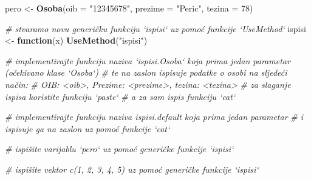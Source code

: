 \documentclass[]{book}
\newenvironment{Shaded}{\begin{snugshade}}{\end{snugshade}}
\newcommand{\KeywordTok}[1]{\textcolor[rgb]{0.13,0.29,0.53}{\textbf{#1}}}
\newcommand{\DataTypeTok}[1]{\textcolor[rgb]{0.13,0.29,0.53}{#1}}
\newcommand{\DecValTok}[1]{\textcolor[rgb]{0.00,0.00,0.81}{#1}}
\newcommand{\CharTok}[1]{\textcolor[rgb]{0.31,0.60,0.02}{#1}}
\newcommand{\StringTok}[1]{\textcolor[rgb]{0.31,0.60,0.02}{#1}}
\newcommand{\CommentTok}[1]{\textcolor[rgb]{0.56,0.35,0.01}{\textit{#1}}}
\newcommand{\ControlFlowTok}[1]{\textcolor[rgb]{0.13,0.29,0.53}{\textbf{#1}}}
\newcommand{\OperatorTok}[1]{\textcolor[rgb]{0.81,0.36,0.00}{\textbf{#1}}}
\newcommand{\NormalTok}[1]{#1}
\theoremstyle{definition}
\theoremstyle{definition}
\theoremstyle{definition}
\theoremstyle{remark}
\begin{document}
\begin{Shaded}
\begin{Highlighting}[]
\NormalTok{pero <-}\StringTok{ }\KeywordTok{Osoba}\NormalTok{(}\DataTypeTok{oib =} \StringTok{"12345678"}\NormalTok{, }\DataTypeTok{prezime =} \StringTok{"Peric"}\NormalTok{, }\DataTypeTok{tezina =} \DecValTok{78}\NormalTok{)}

\CommentTok{# stvaramo novu generičku funkciju `ispisi` uz pomoć funkcije `UseMethod`}
\NormalTok{ispisi <-}\StringTok{ }\ControlFlowTok{function}\NormalTok{(x) }\KeywordTok{UseMethod}\NormalTok{(}\StringTok{"ispisi"}\NormalTok{)}

\CommentTok{# implementirajte funkciju naziva `ispisi.Osoba` koja prima jedan parametar (očekivano klase `Osoba`)}
\CommentTok{# te na zaslon ispisuje podatke o osobi na sljedeći način:}
\CommentTok{# OIB: <oib>, Prezime: <prezime>, tezina: <tezina>}
\CommentTok{# za slaganje ispisa koristite funkciju `paste`}
\CommentTok{# a za sam ispis funkciju `cat`}

\CommentTok{# implementirajte funkciju naziva ispisi.default koja prima jedan parametar}
\CommentTok{# i ispisuje ga na zaslon uz pomoć funkcije `cat`}

\CommentTok{# ispišite varijablu `pero` uz pomoć generičke funkcije `ispisi`}

\CommentTok{# ispišite vektor c(1, 2, 3, 4, 5) uz pomoć generičke funkcije `ispisi`}
\end{Highlighting}
\end{Shaded}

\begin{Shaded}
\end{Shaded}
\end{document}
